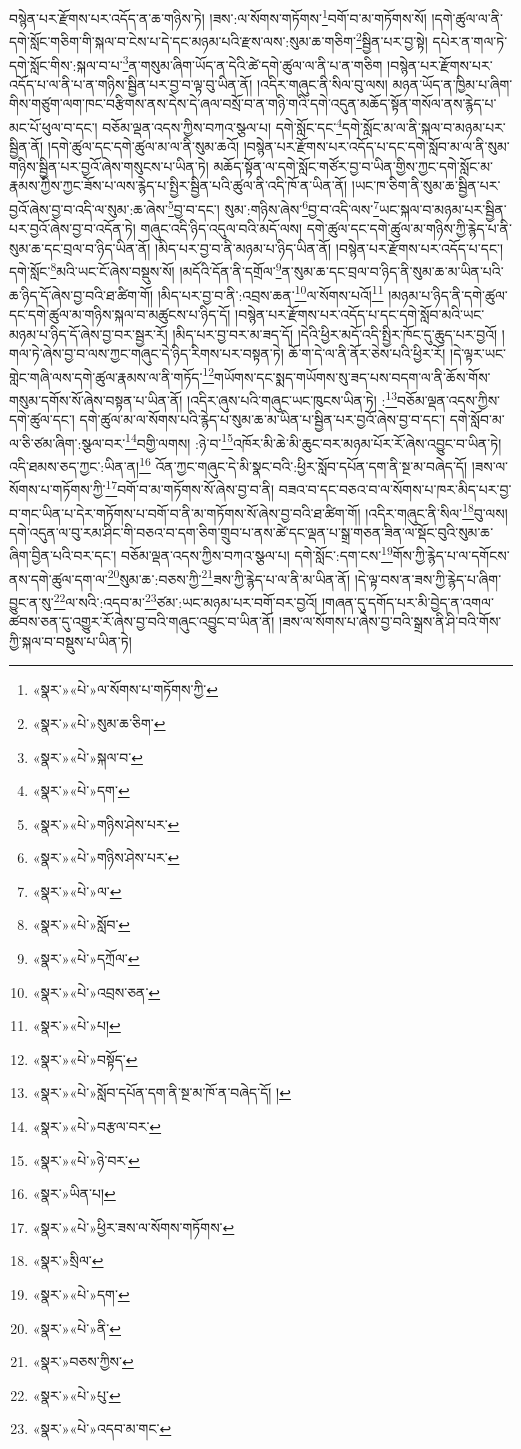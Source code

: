 བསྙེན་པར་རྫོགས་པར་འདོད་ན་ཆ་གཉིས་ཏེ། །ཟས་:ལ་སོགས་གཏོགས་\footnote{«སྣར་»«པེ་»ལ་སོགས་པ་གཏོགས་ཀྱི་}བགོ་བ་མ་གཏོགས་སོ། །དགེ་ཚུལ་ལ་ནི་དགེ་སློང་གཅིག་གི་སྐལ་བ་ངེས་པ་དེ་དང་མཉམ་པའི་རྫས་ལས་:སུམ་ཆ་གཅིག་\footnote{«སྣར་»«པེ་»སུམ་ཆ་ཅིག་}སྦྱིན་པར་བྱ་སྟེ། དཔེར་ན་གལ་ཏེ་དགེ་སློང་གིས་:སྐལ་བ་པ་\footnote{«སྣར་»«པེ་»སྐལ་བ་}ན་གསུམ་ཞིག་ཡོད་ན་དེའི་ཚེ་དགེ་ཚུལ་ལ་ནི་པ་ན་གཅིག །བསྙེན་པར་རྫོགས་པར་འདོད་པ་ལ་ནི་པ་ན་གཉིས་སྦྱིན་པར་བྱ་བ་ལྟ་བུ་ཡིན་ནོ། །འདིར་གཞུང་ནི་སིལ་བུ་ལས། མཉན་ཡོད་ན་ཁྱིམ་པ་ཞིག་གིས་གཙུག་ལག་ཁང་བརྩིགས་ནས་དེས་དེ་ཞལ་བསྲོ་བ་ན་གཉི་གའི་དགེ་འདུན་མཆོད་སྟོན་གསོལ་ནས་རྙེད་པ་མང་པོ་ཕུལ་བ་དང་། བཅོམ་ལྡན་འདས་ཀྱིས་བཀའ་སྩལ་པ། དགེ་སློང་དང་\footnote{«སྣར་»«པེ་»དག་}དགེ་སློང་མ་ལ་ནི་སྐལ་བ་མཉམ་པར་སྦྱིན་ནོ། །དགེ་ཚུལ་དང་དགེ་ཚུལ་མ་ལ་ནི་སུམ་ཆའོ། །བསྙེན་པར་རྫོགས་པར་འདོད་པ་དང་དགེ་སློབ་མ་ལ་ནི་སུམ་གཉིས་སྦྱིན་པར་བྱའོ་ཞེས་གསུངས་པ་ཡིན་ཏེ། མཆོད་སྟོན་ལ་དགེ་སློང་གཙོར་བྱ་བ་ཡིན་གྱིས་ཀྱང་དགེ་སློང་མ་རྣམས་ཀྱིས་ཀྱང་ཟོས་པ་ལས་རྙེད་པ་སྤྱིར་སྦྱིན་པའི་ཚུལ་ནི་འདི་ཁོ་ན་ཡིན་ནོ། །ཡང་ཁ་ཅིག་ནི་སུམ་ཆ་སྦྱིན་པར་བྱའོ་ཞེས་བྱ་བ་འདི་ལ་སུམ་:ཆ་ཞེས་\footnote{«སྣར་»«པེ་»གཉིས་ཤེས་པར་}བྱ་བ་དང་། སུམ་:གཉིས་ཞེས་\footnote{«སྣར་»«པེ་»གཉིས་ཤེས་པར་}བྱ་བ་འདི་ལས་\footnote{«སྣར་»«པེ་»ལ་}ཡང་སྐལ་བ་མཉམ་པར་སྦྱིན་པར་བྱའོ་ཞེས་བྱ་བ་འདོན་ཏེ། གཞུང་འདི་ཉིད་འདུལ་བའི་མདོ་ལས། དགེ་ཚུལ་དང་དགེ་ཚུལ་མ་གཉིས་ཀྱི་རྙེད་པ་ནི་སུམ་ཆ་དང་བྲལ་བ་ཉིད་ཡིན་ནོ། །མིད་པར་བྱ་བ་ནི་མཉམ་པ་ཉིད་ཡིན་ནོ། །བསྙེན་པར་རྫོགས་པར་འདོད་པ་དང་། དགེ་སློང་\footnote{«སྣར་»«པེ་»སློབ་}མའི་ཡང་ངོ་ཞེས་བསྡུས་སོ། །མདོའི་དོན་ནི་དགྲོལ་\footnote{«སྣར་»«པེ་»དཀྲོལ་}ན་སུམ་ཆ་དང་བྲལ་བ་ཉིད་ནི་སུམ་ཆ་མ་ཡིན་པའི་ཆ་ཉིད་དོ་ཞེས་བྱ་བའི་ཐ་ཚིག་གོ། །མིད་པར་བྱ་བ་ནི་:འབྲས་ཆན་\footnote{«སྣར་»«པེ་»འབྲས་ཅན་}ལ་སོགས་པའོ།\footnote{«སྣར་»«པེ་»པ།} །མཉམ་པ་ཉིད་ནི་དགེ་ཚུལ་དང་དགེ་ཚུལ་མ་གཉིས་སྐལ་བ་མཚུངས་པ་ཉིད་དོ། །བསྙེན་པར་རྫོགས་པར་འདོད་པ་དང་དགེ་སློབ་མའི་ཡང་མཉམ་པ་ཉིད་དོ་ཞེས་བྱ་བར་སྦྱར་རོ། །མིད་པར་བྱ་བར་མ་ཟད་དོ། །དེའི་ཕྱིར་མདོ་འདི་སྤྱིར་ཁོང་དུ་ཆུད་པར་བྱའོ། །གལ་ཏེ་ཞེས་བྱ་བ་ལས་ཀྱང་གཞུང་དེ་ཉིད་རིགས་པར་བསྟན་ཏེ། ཆོ་ག་དེ་ལ་ནི་ནོར་ཅེས་པའི་ཕྱིར་རོ། །དེ་ལྟར་ཡང་གླེང་གཞི་ལས་དགེ་ཚུལ་རྣམས་ལ་ནི་གཏོད་\footnote{«སྣར་»«པེ་»བསྟོད་}གཡོགས་དང་སྨད་གཡོགས་སུ་ཟད་པས་བདག་ལ་ནི་ཆོས་གོས་གསུམ་དགོས་སོ་ཞེས་བསྟན་པ་ཡིན་ནོ། །འདིར་ཞུས་པའི་གཞུང་ཡང་ཁུངས་ཡིན་ཏེ། :\footnote{«སྣར་»«པེ་»སློབ་དཔོན་དག་ནི་སྔ་མ་ཁོ་ན་བཞེད་དོ། །}བཅོམ་ལྡན་འདས་ཀྱིས་དགེ་ཚུལ་དང་། དགེ་ཚུལ་མ་ལ་སོགས་པའི་རྙེད་པ་སུམ་ཆ་མ་ཡིན་པ་སྦྱིན་པར་བྱའོ་ཞེས་བྱ་བ་དང་། དགེ་སློབ་མ་ལ་ཅི་ཙམ་ཞིག་:སྩལ་བར་\footnote{«སྣར་»«པེ་»བརྩལ་བར་}བགྱི་ལགས། :ཉེ་བ་\footnote{«སྣར་»«པེ་»ཉེ་བར་}འཁོར་མི་ཆེ་མི་ཆུང་བར་མཉམ་པོར་རོ་ཞེས་འབྱུང་བ་ཡིན་ཏེ། འདི་ཐམས་ཅད་ཀྱང་:ཡིན་ན།\footnote{«སྣར་»ཡིན་པ།} འོན་ཀྱང་གཞུང་དེ་མི་སྣང་བའི་:ཕྱིར་སློབ་དཔོན་དག་ནི་སྔ་མ་བཞེད་དོ། །ཟས་ལ་སོགས་པ་གཏོགས་ཀྱི་\footnote{«སྣར་»«པེ་»ཕྱིར་ཟས་ལ་སོགས་གཏོགས་}བགོ་བ་མ་གཏོགས་སོ་ཞེས་བྱ་བ་ནི། བཟའ་བ་དང་བཅའ་བ་ལ་སོགས་པ་ཁར་མིད་པར་བྱ་བ་གང་ཡིན་པ་དེར་གཏོགས་པ་བགོ་བ་ནི་མ་གཏོགས་སོ་ཞེས་བྱ་བའི་ཐ་ཚིག་གོ། །འདིར་གཞུང་ནི་སིལ་\footnote{«སྣར་»སྲིལ་}བུ་ལས། དགེ་འདུན་ལ་བུ་རམ་ཤིང་གི་བཅའ་བ་དག་ཅིག་གྲུབ་པ་ནས་ཚེ་དང་ལྡན་པ་སྒྲ་གཅན་ཟིན་ལ་སྡོང་བུའི་སུམ་ཆ་ཞིག་བྱིན་པའི་བར་དང་། བཅོམ་ལྡན་འདས་ཀྱིས་བཀའ་སྩལ་པ། དགེ་སློང་:དག་ངས་\footnote{«སྣར་»«པེ་»དག་}གོས་ཀྱི་རྙེད་པ་ལ་དགོངས་ནས་དགེ་ཚུལ་དག་ལ་\footnote{«སྣར་»«པེ་»ནི་}སུམ་ཆ་:བཅས་ཀྱི་\footnote{«སྣར་»བཅས་ཀྱིས་}ཟས་ཀྱི་རྙེད་པ་ལ་ནི་མ་ཡིན་ནོ། །དེ་ལྟ་བས་ན་ཟས་ཀྱི་རྙེད་པ་ཞིག་བྱུང་ན་སུ་\footnote{«སྣར་»«པེ་»པུ་}ལ་སའི་:འདབ་མ་\footnote{«སྣར་»«པེ་»འདབ་མ་གང་}ཙམ་:ཡང་མཉམ་པར་བགོ་བར་བྱའོ། །གཞན་དུ་དགོད་པར་མི་བྱེད་ན་འགལ་ཚབས་ཅན་དུ་འགྱུར་རོ་ཞེས་བྱ་བའི་གཞུང་འབྱུང་བ་ཡིན་ནོ། །ཟས་ལ་སོགས་པ་ཞེས་བྱ་བའི་སྒྲས་ནི་ཤི་བའི་གོས་ཀྱི་སྐལ་བ་བསྡུས་པ་ཡིན་ཏེ། 